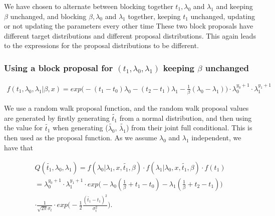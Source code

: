 
We have chosen to alternate between blocking together $t_1, \lambda_0$ and  $ \lambda_1$ and keeping $\beta$ unchanged, and blocking $\beta, \lambda_0$ and $\lambda_1$ together, keeping $t_1$ unchanged, updating or not updating the parameters every other time These two block proposals have different target distributions and different proposal distributions. This again leads to the expressions for the proposal distributions to be different.


\subsubsection{Using a block proposal for $(t_1, \lambda_0, \lambda_1)$ keeping $\beta$ unchanged}

\begin{align}
    f(t_1, \lambda_0, \lambda_1|\beta, x) = exp \Big( -(t_1-t_0)\lambda_0 -(t_2-t_1)\lambda_1 - \frac{1}{\beta}(\lambda_0 - \lambda_1)\Big) \cdot\lambda_0^{y_0 + 1} \cdot \lambda_1^{y_1 + 1} 
\end{align}

We use a random walk proposal function, and the random walk proposal values are generated by firstly generating $\widetilde{t_1}$ from a normal distribution, and then using the value for $\widetilde{t_1}$ when generating ($\widetilde{\lambda_0}$, $\widetilde{\lambda_1}$) from their joint full conditional. This is then used as the proposal function. As we assume $\lambda_0$ and $\lambda_1$ independent, we have that 

\begin{align}
    Q(\widetilde{t_1}, \lambda_0, \lambda_1) = f(\lambda_0| \lambda_1, x, \widetilde{t_1}, \beta)\cdot f(\lambda_1| \lambda_0, x, \widetilde{t_1}, \beta)\cdot f(t_1) \nonumber \\
    = \lambda_0^{y_0 + 1} \cdot \lambda_1^{y_1 + 1} \cdot exp \Big(  -\lambda_0(\frac{1}{\beta} + t_1 - t_0) - \lambda_1(\frac{1}{\beta} + t_2 - t_1)  \Big)  \nonumber \\ \cdot \frac{1}{\sqrt{2 \pi}\sigma_t } \cdot exp \Big(  -\frac{1}{2} \frac{(\widetilde{t_1}-t_1)^2}{\sigma_t^2} \Big).
\end{align}



